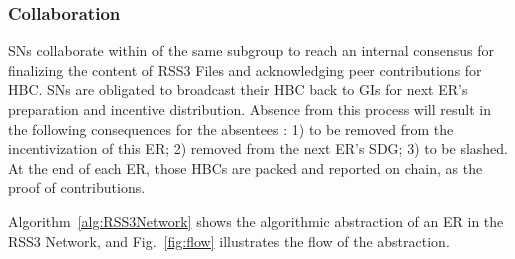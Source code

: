 \subsubsection{Collaboration}

SNs collaborate within of the same subgroup to reach an internal consensus for finalizing the content of RSS3 Files and acknowledging peer contributions for HBC. SNs are obligated to broadcast their HBC back to GIs for next ER's preparation and incentive distribution. Absence from this process will result in the following consequences for the absentees : 1) to be removed from the incentivization of this ER; 2) removed from the next ER's SDG; 3) to be slashed. At the end of each ER, those HBCs are packed and reported on chain, as the proof of contributions.

Algorithm~\ref{alg:RSS3Network} shows the algorithmic abstraction of an ER in the RSS3 Network, and Fig.~\ref{fig:flow} illustrates the flow of the abstraction.

